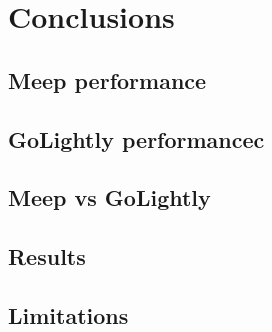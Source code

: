 \chapter{Conclusions} \label{ch:conclusions}

\section{Meep performance}
\section{GoLightly performancec}
\section{Meep vs GoLightly}
\section{Results}
\section{Limitations}
